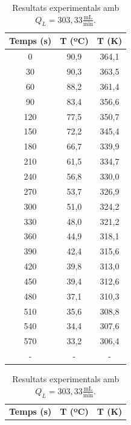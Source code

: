 \documentclass[10pt, twoside]{article}
\begin{document}
\begin{table}[H]
\begin{minipage}{0.3\textwidth}
        \label{tabla:muestra1}
    \end{minipage}%
    \hfill
    \begin{minipage}{0.3\textwidth}
        \centering
        \caption{Resultats experimentals amb $Q_L = 253,33 \frac{\text{mL}}{\text{min}}$.}
        \begin{tabular}{ccc}
            \toprule
            \textbf{Temps (s)} & \textbf{T (ºC)} & \textbf{T (K)} \\
            \midrule
            0   & 90,9 & 364,1 \\
            30  & 90,3 & 363,5 \\
            60  & 88,2 & 361,4 \\
            90  & 83,4 & 356,6 \\
            120 & 77,5 & 350,7 \\
            150 & 72,2 & 345,4 \\
            180 & 66,7 & 339,9 \\
            210 & 61,5 & 334,7 \\
            240 & 56,8 & 330,0 \\
            270 & 53,7 & 326,9 \\
            300 & 51,0 & 324,2 \\
            330 & 48,0 & 321,2 \\
            360 & 44,9 & 318,1 \\
            390 & 42,4 & 315,6 \\
            420 & 39,8 & 313,0 \\
            450 & 39,4 & 312,6 \\
            480 & 37,1 & 310,3 \\
            510 & 35,6 & 308,8 \\
            540 & 34,4 & 307,6 \\
            570 & 33,2 & 306,4 \\
            - & - & - \\
            \bottomrule
        \end{tabular}
        \label{tabla:muestra2}
    \end{minipage}%
    \hfill
    \begin{minipage}{0.3\textwidth}
        \centering
        \caption{Resultats experimentals amb $Q_L = 303,33 \frac{\text{mL}}{\text{min}}$.}
        \begin{tabular}{ccc}
            \toprule
            \textbf{Temps (s)} & \textbf{T (ºC)} & \textbf{T (K)} \\

\end{tabular}
\end{minipage}
\end{table}
\end{document}
